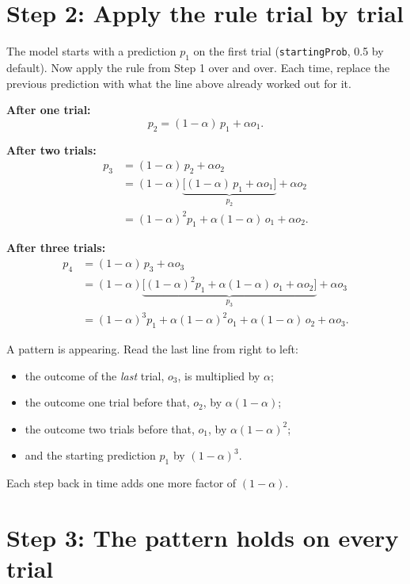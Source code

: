 \documentclass[11pt,a4paper]{article}
\begin{document}
\section*{Step 2: Apply the rule trial by trial}

The model starts with a prediction $p_1$ on the first trial (\texttt{startingProb}, 0.5 by
default). Now apply the rule from Step 1 over and over. Each time, replace the previous
prediction with what the line above already worked out for it.

\textbf{After one trial:}
\begin{equation*}
  p_2 = (1-\alpha)\, p_1 + \alpha o_1 .
\end{equation*}

\textbf{After two trials:}
\begin{align*}
  p_3 &= (1-\alpha)\, p_2 + \alpha o_2 \\
      &= (1-\alpha) \underbrace{\bigl[(1-\alpha)\, p_1 + \alpha o_1\bigr]}_{p_2} + \alpha o_2 \\
      &= (1-\alpha)^2 p_1 + \alpha(1-\alpha)\, o_1 + \alpha o_2 .
\end{align*}

\textbf{After three trials:}
\begin{align*}
  p_4 &= (1-\alpha)\, p_3 + \alpha o_3 \\
      &= (1-\alpha) \underbrace{\bigl[(1-\alpha)^2 p_1 + \alpha(1-\alpha)\, o_1
         + \alpha o_2\bigr]}_{p_3} + \alpha o_3 \\
      &= (1-\alpha)^3 p_1 + \alpha(1-\alpha)^2 o_1 + \alpha(1-\alpha)\, o_2 + \alpha o_3 .
\end{align*}

A pattern is appearing. Read the last line from right to left:
\begin{itemize}
  \item the outcome of the \emph{last} trial, $o_3$, is multiplied by $\alpha$;
  \item the outcome one trial before that, $o_2$, by $\alpha(1-\alpha)$;
  \item the outcome two trials before that, $o_1$, by $\alpha(1-\alpha)^2$;
  \item and the starting prediction $p_1$ by $(1-\alpha)^3$.
\end{itemize}
Each step back in time adds one more factor of $(1-\alpha)$.

\section*{Step 3: The pattern holds on every trial}
\end{document}
